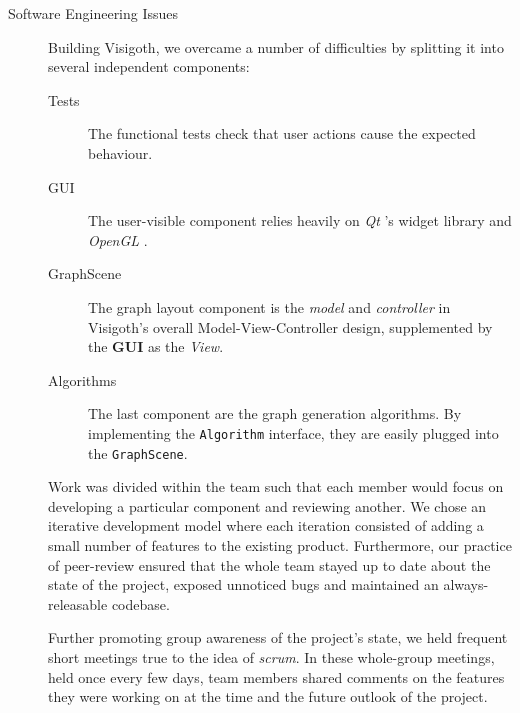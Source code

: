 \documentclass[a4paper,11pt]{article}
\newcommand{\code}[1]{\texttt{#1}}
\newcommand{\buzz}[1]{\emph{#1}}
\newcommand{\Qt}{\buzz{Qt} }
\newcommand{\OpenGL}{\buzz{OpenGL} }
\begin{document}
\begin{description}
\item[Software Engineering Issues]

  Building Visigoth, we overcame a number of difficulties by splitting
  it into several independent components:

  \begin{description}
  \item[Tests] The functional tests check that user actions cause the
    expected behaviour.

  \item[GUI] The user-visible component relies heavily on \Qt's widget
    library and \OpenGL.

  \item[GraphScene] The graph layout component is the \emph{model} and
    \emph{controller} in Visigoth's overall Model-View-Controller
    design, supplemented by the \textbf{GUI} as the \emph{View}.

  \item[Algorithms] The last component are the graph generation
    algorithms. By implementing the \code{Algorithm} interface, they
    are easily plugged into the \code{GraphScene}.
  \end{description}

  Work was divided within the team such that each member would focus
  on developing a particular component and reviewing another. We chose
  an iterative development model where each iteration consisted of
  adding a small number of features to the existing
  product. Furthermore, our practice of peer-review ensured that the
  whole team stayed up to date about the state of the project, exposed
  unnoticed bugs and maintained an always-releasable codebase.

  Further promoting group awareness of the project's state, we held
  frequent short meetings true to the idea of \emph{scrum}. In these
  whole-group meetings, held once every few days, team members shared
  comments on the features they were working on at the time and the
  future outlook of the project.


\end{description}
\end{document}
